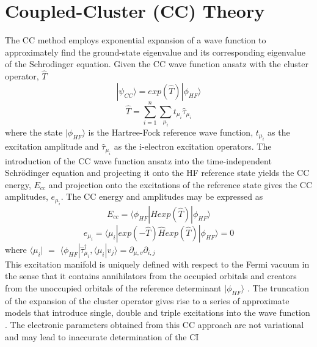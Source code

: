 \documentclass[a4paper,11pt]{report}
\begin{document}
\section{Coupled-Cluster (CC) Theory}
The CC method employs exponential expansion of a wave function to approximately find the 
ground-state eigenvalue and its corresponding eigenvalue of the Schrodinger equation. 
Given the CC wave function ansatz \citep{bartlett2007coupled} 
 with the cluster operator,  $\hat{T}$
\begin{equation}\label{ns5}
|\psi_{CC}\big \rangle  = exp(\hat{T})|\phi_{HF}\big \rangle 
\end{equation}
\begin{equation}\label{ns6}
\hat{T} = \sum_{i=1}^{n}\sum_{\mu_{i}}t_{\mu_{i}}\hat{\tau}_{\mu_{i}}
\end{equation}
where the state $|\phi_{HF}\big \rangle $ is the Hartree-Fock reference wave function, $t_{\mu_{i}}$ as the excitation amplitude and $\hat{\tau}_{\mu_{i}}$ as 
the i-electron excitation operators. The introduction of the CC wave function ansatz into the time-independent Schrödinger equation and projecting it onto the HF reference state
yields the CC energy, $E_{cc}$ and projection onto the excitations of the 
reference state gives the CC amplitudes, $e_{\mu_{i}}$. The CC energy and 
amplitudes may be expressed as
\begin{equation}\label{ns7}
E_{cc}=\big \langle \phi_{HF}|\hat{H}exp(\hat{T})|\phi_{HF}\big \rangle 
\end{equation}
\begin{equation}\label{aede1}
e_{\mu_{i}} = \big \langle \mu_{i}|exp(-\hat{T})\hat{H}exp(\hat{T})|\phi_{HF}\big \rangle  =0
\end{equation}
where $\big \langle \mu_{i}|$ $=$ $\big \langle \phi_{HF}|\hat{\tau}^{\dagger}_{\mu_{i}}, \big \langle \mu_{i}|v_{j}\big \rangle  =\partial_{\mu,v}\partial_{i,j}$\\
This excitation manifold is uniquely defined with respect to the Fermi vacuum in the sense
that it contains annihilators from the occupied orbitals and creators from the unoccupied 
orbitals of the reference determinant $|\phi_{HF}\big \rangle $ \citep{koch1990coupled,hanrath2005exponential}. 
The truncation of the expansion of the cluster operator gives rise to
a series of approximate models that introduce single, double and triple excitations into the wave function \citep{bartlett2007coupled}. The
electronic parameters obtained from this CC approach are 
not variational and may lead to inaccurate determination of the  CI 
\end{document}
